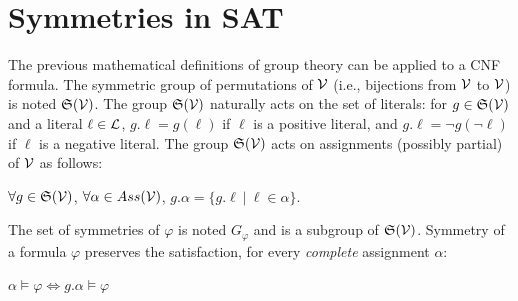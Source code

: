 \section{Symmetries in SAT}
The previous mathematical definitions of group theory can be applied to a CNF formula.
The symmetric group of permutations of $\mathcal{V}$ (i.e., bijections from $\mathcal{V}$ to $\mathcal{V}$) is noted
$\mathfrak{S}(\mathcal{V})$. The group $\mathfrak{S}(\mathcal{V})$ naturally acts on the set of literals: for $g
\in \mathfrak{S}(\mathcal{V})$ and a literal $\ell \in \mathcal{L} $, $g.\ell = g(\ell)$ if $\ell$ is a
positive literal, and $g.\ell = \neg g(\neg \ell)$ if $\ell$ is a negative literal.
The group $\mathfrak{S}(\mathcal{V})$ acts on  assignments (possibly partial) of $\mathcal{V}$ as follows: 
\begin{center}
 $\forall g \in \mathfrak{S}(\mathcal{V})$, $ \forall \alpha \in Ass(\mathcal{V})$, $g.\alpha = \{ g.\ell ~|~ \ell \in \alpha \}$.
\end{center}
The set of symmetries of $\varphi$ is noted $G_{\varphi}$ and is a subgroup of $\mathfrak{S}(\mathcal{V})$.
Symmetry of a formula $\varphi$ preserves the satisfaction, for every \emph{complete} assignment $\alpha$:
\begin{center}
 $\alpha \models \varphi\Leftrightarrow g.\alpha \models \varphi$
\end{center}
% 

